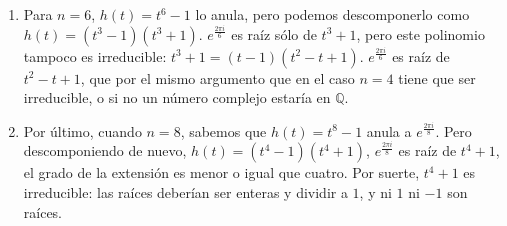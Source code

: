 \begin{problem}
\begin{enumerate}
\begin{enumerate}
\item Para $n=6$, $h(t) = t^6 - 1$ lo anula, pero podemos descomponerlo como $h(t) = (t^3 - 1)(t^3 + 1)$. $e^{\frac{2πi}{6}}$ es raíz sólo de $t^3 + 1$, pero este polinomio tampoco es irreducible: $t^3 + 1 = (t-1)(t^2 - t + 1)$. $e^{\frac{2πi}{6}}$ es raíz de $t^2-t+1$, que por el mismo argumento que en el caso $n=4$ tiene que ser irreducible, o si no un número complejo estaría en $ℚ$.

\item Por último, cuando $n=8$, sabemos que $h(t) = t^8 - 1$ anula a $e^{\frac{2πi}{8}}$. Pero descomponiendo de nuevo, $h(t) = (t^4 -1)(t^4 +1)$, $e^{\frac{2πi}{8}}$ es raíz de $t^4 +1$, el grado de la extensión es menor o igual que cuatro. Por suerte, $t^4 + 1$ es irreducible: las raíces deberían ser enteras y dividir a $1$, y ni $1$ ni $-1$ son raíces.
\end{enumerate}
\end{enumerate}
\end{problem}


